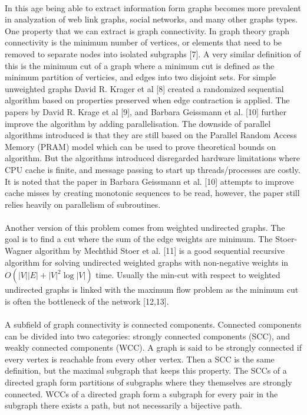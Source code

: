 \documentclass[]{article}
\begin{document}
\paragraph{}
In this age being able to extract information form graphs becomes more prevalent in analyzation of web link graphs, social networks, and many other graphs types. One property that we can extract is graph connectivity. In graph theory graph connectivity is the minimum number of vertices, or elements that need to be removed to separate nodes into isolated subgraphs [7]. A very similar definition of this is the minimum cut of a graph where a minimum cut is defined as the minimum partition of verticies, and edges into two disjoint sets. For simple unweighted graphs David R. Krager et al [8] created a randomized sequential algorithm based on properties preserved when edge contraction is applied. The papers by David R. Krage et al [9], and Barbara Geissmann et al. [10] further improve the algorithm by adding parallelisation. The downside of parallel algorithms introduced is that they are still based on the Parallel Random Access Memory (PRAM) model which can be used to prove theoretical bounds on algorithm. But the algorithms introduced disregarded hardware limitations where CPU cache is finite, and message passing to start up threads/processes are costly. It is noted that the paper in Barbara Geissmann et al. [10] attempts to improve cache misses by creating monotonic sequences to be read, however, the paper still relies heavily on parallelism of
 subroutines.
 
 \paragraph{}
 Another version of this problem comes from weighted undirected graphs. The goal is to find a cut where the sum of the edge weights are minimum. The Stoer-Wagner algorithm by Mechthid Stoer et al. [11]  is a good sequential recursive algorithm for solving undirected weighted graphs with non-negative weights in $O(|V||E|+|V|^2\log|V|)$ time. Usually the min-cut with respect to weighted undirected graphs is linked with the maximum flow problem as the minimum cut is often the bottleneck of the network [12,13].
 
 \paragraph{}
 A subfield of graph connectivity is connected components. Connected components can be divided into two categories: strongly connected components (SCC), and weakly connected components (WCC). A graph is said to be strongly connected if every vertex is reachable from every other vertex. Then a SCC is the same definition, but the maximal subgraph that keeps this property. The SCCs of a directed graph form partitions of subgraphs where they themselves are strongly connected. WCCs of a directed graph form a subgraph for every pair in the subgraph there exists a path, but not necessarily a bijective path. 
 
\end{document}
